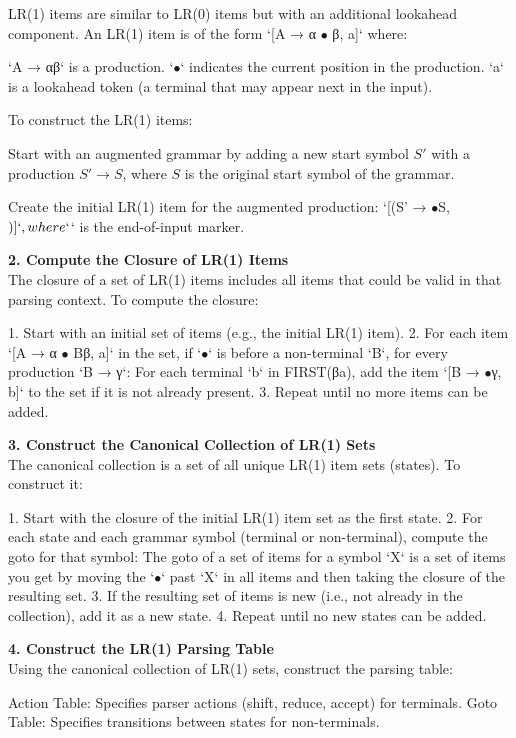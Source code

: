 LR(1) items are similar to LR(0) items but with an additional lookahead component. An LR(1) item is of the form `[A → α $\bullet$ β, a]` where:

`A → αβ` is a production.
`$\bullet$` indicates the current position in the production.
`a` is a lookahead token (a terminal that may appear next in the input).

To construct the LR(1) items:

Start with an augmented grammar by adding a new start symbol \(S'\) with a production \(S' \to S\), where \(S\) is the original start symbol of the grammar.

Create the initial LR(1) item for the augmented production: `[(S' → $\bullet$S, $)]`, where `$` is the end-of-input marker.

\textbf{2. Compute the Closure of LR(1) Items}\\

The closure of a set of LR(1) items includes all items that could be valid in that parsing context. To compute the closure:

1. Start with an initial set of items (e.g., the initial LR(1) item).
2. For each item `[A → α $\bullet$ Bβ, a]` in the set, if `$\bullet$` is before a non-terminal `B`, for every production `B → γ`:
   For each terminal `b` in FIRST(βa), add the item `[B → $\bullet$γ, b]` to the set if it is not already present.
3. Repeat until no more items can be added.

\textbf{3. Construct the Canonical Collection of LR(1) Sets}\\

The canonical collection is a set of all unique LR(1) item sets (states). To construct it:

1. Start with the closure of the initial LR(1) item set as the first state.
2. For each state and each grammar symbol (terminal or non-terminal), compute the goto for that symbol:
   The goto of a set of items for a symbol `X` is a set of items you get by moving the `$\bullet$` past `X` in all items and then taking the closure of the resulting set.
3. If the resulting set of items is new (i.e., not already in the collection), add it as a new state.
4. Repeat until no new states can be added.

\textbf{4. Construct the LR(1) Parsing Table}\\

Using the canonical collection of LR(1) sets, construct the parsing table:

Action Table: Specifies parser actions (shift, reduce, accept) for terminals.
Goto Table: Specifies transitions between states for non-terminals.

